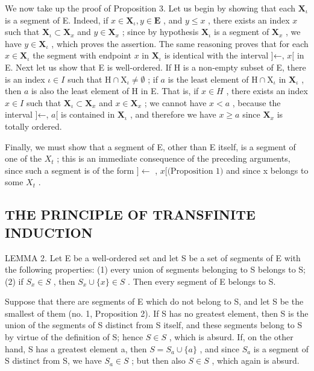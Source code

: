 We now take up the proof of Proposition 3. Let us begin by showing that each \(\mathbf{X}_{\iota}\) is a segment of E. Indeed, if \(x \in \mathbf{X}_{\iota}, y \in \mathbf{E}\) , and \(y \leqslant x\) , there exists an index \(x\) such that \(\mathbf{X}_{\iota} \subset \mathbf{X}_{x}\) and \(y \in \mathbf{X}_{x}\) ; since by hypothesis \(\mathbf{X}_{\iota}\) is a segment of \(\mathbf{X}_{x}\) , we have \(y \in \mathbf{X}_{\iota}\) , which proves the assertion. The same reasoning proves that for each \(x \in \mathbf{X}_{\iota}\) the segment with endpoint \(x\) in \(\mathbf{X}_{\iota}\) is identical with the interval {]}←, \(x[\) in E. Next let us show that E is well-ordered. If H is a non-empty subset of E, there is an index \(\iota \in I\) such that \(\mathrm{H} \cap \mathrm{X}_{\iota} \neq \emptyset\) ; if \(a\) is the least element of \(\mathrm{H} \cap \mathrm{X}_{\iota}\) in \(\mathbf{X}_{\iota}\) , then \(a\) is also the least element of H in E. That is, if \(x \in H\) , there exists an index \(x \in I\) such that \(\mathbf{X}_{\iota} \subset \mathbf{X}_{x}\) and \(x \in \mathbf{X}_{x}\) ; we cannot have \(x < a\) , because the interval {]}←, \(a[\) is contained in \(\mathbf{X}_{\iota}\) , and therefore we have \(x \geqslant a\) since \(\mathbf{X}_{x}\) is totally ordered.

Finally, we must show that a segment of E, other than E itself, is a segment of one of the \(X_{t}\) ; this is an immediate consequence of the preceding arguments, since such a segment is of the form \(]\leftarrow\) , \(x[\text{(Proposition 1)}\) and since x belongs to some \(X_{t}\) .

\subsection{THE PRINCIPLE OF TRANSFINITE INDUCTION}

LEMMA 2. Let E be a well-ordered set and let S be a set of segments of E with the following properties: (1) every union of segments belonging to S belongs to S; (2) if \(S_{x} \in S\) , then \(S_{x} \cup \{x\} \in S\) . Then every segment of E belongs to S.

Suppose that there are segments of E which do not belong to S, and let S be the smallest of them (no. 1, Proposition 2). If S has no greatest element, then S is the union of the segments of S distinct from S itself, and these segments belong to S by virtue of the definition of S; hence \(S \in S\) , which is absurd. If, on the other hand, S has a greatest element a, then \(S = S_{a} \cup \{a\}\) , and since \(S_{a}\) is a segment of S distinct from S, we have \(S_{a} \in S\) ; but then also \(S \in S\) , which again is absurd.

